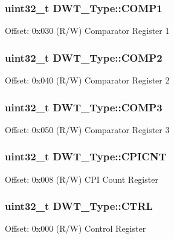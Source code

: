 \subsubsection[{\texorpdfstring{C\+O\+M\+P1}{COMP1}}]{ uint32\+\_\+t D\+W\+T\+\_\+\+Type\+::\+C\+O\+M\+P1}\hypertarget{structDWT__Type_a4a5bb70a5ce3752bd628d5ce5658cb0c}{}\label{structDWT__Type_a4a5bb70a5ce3752bd628d5ce5658cb0c}
Offset\+: 0x030 (R/W) Comparator Register 1 
\subsubsection[{\texorpdfstring{C\+O\+M\+P2}{COMP2}}]{ uint32\+\_\+t D\+W\+T\+\_\+\+Type\+::\+C\+O\+M\+P2}\hypertarget{structDWT__Type_a8927aedbe9fd6bdae8983088efc83332}{}\label{structDWT__Type_a8927aedbe9fd6bdae8983088efc83332}
Offset\+: 0x040 (R/W) Comparator Register 2 
\subsubsection[{\texorpdfstring{C\+O\+M\+P3}{COMP3}}]{ uint32\+\_\+t D\+W\+T\+\_\+\+Type\+::\+C\+O\+M\+P3}\hypertarget{structDWT__Type_a3df15697eec279dbbb4b4e9d9ae8b62f}{}\label{structDWT__Type_a3df15697eec279dbbb4b4e9d9ae8b62f}
Offset\+: 0x050 (R/W) Comparator Register 3 
\subsubsection[{\texorpdfstring{C\+P\+I\+C\+NT}{CPICNT}}]{ uint32\+\_\+t D\+W\+T\+\_\+\+Type\+::\+C\+P\+I\+C\+NT}\hypertarget{structDWT__Type_a88cca2ab8eb1b5b507817656ceed89fc}{}\label{structDWT__Type_a88cca2ab8eb1b5b507817656ceed89fc}
Offset\+: 0x008 (R/W) C\+PI Count Register 
\subsubsection[{\texorpdfstring{C\+T\+RL}{CTRL}}]{ uint32\+\_\+t D\+W\+T\+\_\+\+Type\+::\+C\+T\+RL}\hypertarget{structDWT__Type_a37964d64a58551b69ce4c8097210d37d}{}\label{structDWT__Type_a37964d64a58551b69ce4c8097210d37d}
Offset\+: 0x000 (R/W) Control Register 
